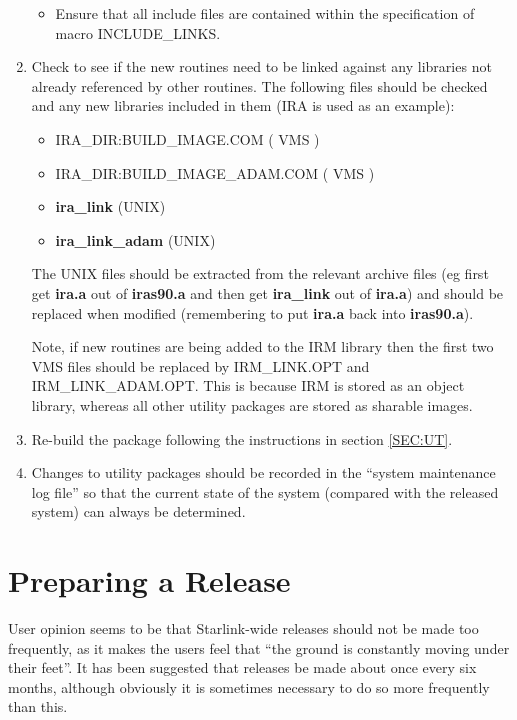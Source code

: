 \begin{enumerate}
\begin{itemize}
\item Ensure that all include files are contained within the specification of
macro {\small INCLUDE\_LINKS}.

\end{itemize}

\item Check to see if the new routines need to be linked against any libraries
not already referenced by other routines. The following files should be checked
and any new libraries included in them ({\small IRA} is used as an example):

\begin{itemize}
\item {\small IRA\_DIR:BUILD\_IMAGE.COM ( VMS )}
\item {\small IRA\_DIR:BUILD\_IMAGE\_ADAM.COM ( VMS )}
\item {\bf ira\_link} ({\small UNIX})
\item {\bf ira\_link\_adam} ({\small UNIX})
\end{itemize}

The {\small UNIX} files should be extracted from the relevant archive files (eg
first get {\bf ira.a} out of {\bf iras90.a} and then get {\bf ira\_link} out of
{\bf ira.a}) and should be replaced when modified (remembering to put {\bf
ira.a} back into {\bf iras90.a}).

Note, if new routines are being added to the {\small IRM} library then the first
two {\small VMS} files should be replaced by {\small IRM\_LINK.OPT} and {\small
IRM\_LINK\_ADAM.OPT}. This is because {\small IRM} is stored as an object
library, whereas all other utility packages are stored as sharable images.

\item Re-build the package following the instructions in section \ref{SEC:UT}.

\item Changes to utility packages should be recorded in the ``system maintenance log
file'' so that the current state of the system (compared with the released
system) can always be determined.
\end{enumerate}

\section{Preparing a Release}
User opinion seems to be that Starlink-wide releases should not be made too
frequently, as it makes the users feel that ``the ground is constantly moving
under their feet''. It has been suggested that releases be made about once every
six months, although obviously it is sometimes necessary to do so more
frequently than this.

